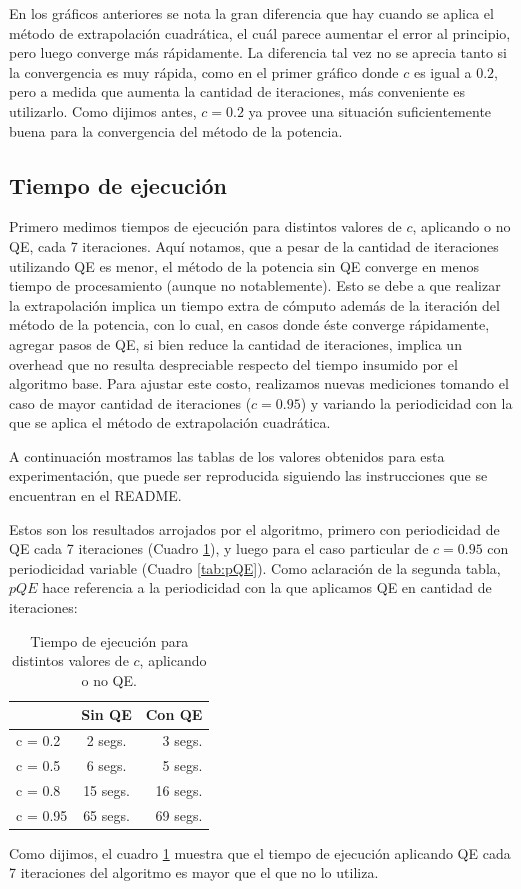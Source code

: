 En los gr\'aficos anteriores se nota la gran diferencia que hay cuando se aplica el m\'etodo de extrapolaci\'on cuadr\'atica, el cu\'al parece aumentar el error al principio, pero luego converge m\'as r\'apidamente. La diferencia tal vez no se aprecia tanto si la convergencia es muy r\'apida, como en el primer gr\'afico donde $c$ es igual a $0.2$, pero a medida que aumenta la cantidad de iteraciones, más conveniente es utilizarlo. Como dijimos antes, $c = 0.2$ ya provee una situación suficientemente buena para la convergencia del método de la potencia.\\


\subsection{Tiempo de ejecuci\'on}

Primero medimos tiempos de ejecuci\'on para distintos valores de $c$, aplicando o no QE, cada 7 iteraciones. Aquí notamos, que a pesar de la cantidad de iteraciones utilizando QE es menor, el m\'etodo de la potencia sin QE converge en menos tiempo de procesamiento (aunque no notablemente). Esto se debe a que realizar la extrapolación implica un tiempo extra de cómputo además de la iteración del método de la potencia, con lo cual, en casos donde éste converge rápidamente, agregar pasos de QE, si bien reduce la cantidad de iteraciones, implica un overhead que no resulta despreciable respecto del tiempo insumido por el algoritmo base. Para ajustar este costo, realizamos nuevas mediciones tomando el caso de mayor cantidad de iteraciones ($c = 0.95$) y variando la periodicidad con la que se aplica el método de extrapolación cuadrática.

A continuación mostramos las tablas de los valores obtenidos para esta experimentación, que puede ser reproducida siguiendo las instrucciones que se encuentran en el README.

Estos son los resultados arrojados por el algoritmo, primero con periodicidad de QE cada 7 iteraciones (Cuadro \ref{tab:tiempo}), y luego para el caso particular de $c = 0.95$ con periodicidad variable (Cuadro \ref{tab:pQE}). Como aclaración de la segunda tabla, $pQE$ hace referencia a la periodicidad con la que aplicamos QE en cantidad de iteraciones: \\
\begin{table}[H]
\centering
\begin{tabular}{ l | c | r}
  & Sin QE & Con QE\\
  \hline
  c = 0.2 & 2 segs. & 3 segs.\\
  \hline
  c = 0.5 & 6 segs. & 5 segs.\\
  \hline
  c = 0.8 & 15 segs. & 16 segs. \\
  \hline
  c = 0.95 & 65 segs. & 69 segs. \\
  \hline
\end{tabular}
\caption{Tiempo de ejecución para distintos valores de $c$, aplicando o no QE.}
\label{tab:tiempo}
\end{table}
 Como dijimos, el cuadro \ref{tab:tiempo} muestra que el tiempo de ejecución  aplicando QE cada 7 iteraciones del algoritmo es mayor que el que no lo utiliza.

